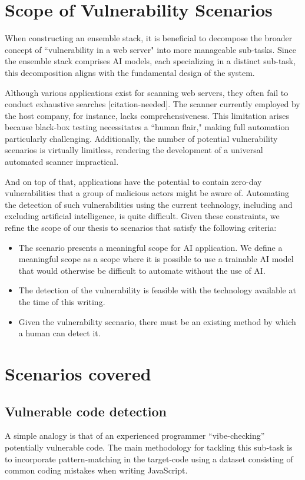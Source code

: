 \section{Scope of Vulnerability Scenarios}
When constructing an ensemble stack, it is beneficial to decompose the broader concept of ``vulnerability in a web server" into more manageable sub-tasks. Since the ensemble stack comprises AI models, each specializing in a distinct sub-task, this decomposition aligns with the fundamental design of the system. 

Although various applications exist for scanning web servers, they often fail to conduct exhaustive searches [citation-needed]. The scanner currently employed by the host company, for instance, lacks comprehensiveness. This limitation arises because black-box testing necessitates a ``human flair," making full automation particularly challenging. Additionally, the number of potential vulnerability scenarios is virtually limitless, rendering the development of a universal automated scanner impractical. 

And on top of that, applications have the potential to contain zero-day vulnerabilities that a group of malicious actors might be aware of. Automating the detection of such vulnerabilities using the current technology, including and excluding artificial intelligence, is quite difficult. Given these constraints, we refine the scope of our thesis to scenarios that satisfy the following criteria:

\begin{itemize}
    \item The scenario presents a meaningful scope for AI application. We define a meaningful scope as a scope where it is possible to use a trainable AI model that would otherwise be difficult to automate without the use of AI.
    \item The detection of the vulnerability is feasible with the technology available at the time of this writing.
    \item Given the vulnerability scenario, there must be an existing method by which a human can detect it.
\end{itemize}


\section{Scenarios covered}
\subsection{Vulnerable code detection}
A simple analogy is that of an experienced programmer ``vibe-checking'' potentially vulnerable code. The main methodology for tackling this sub-task is to incorporate pattern-matching in the target-code using a dataset consisting of common coding mistakes when writing JavaScript.



